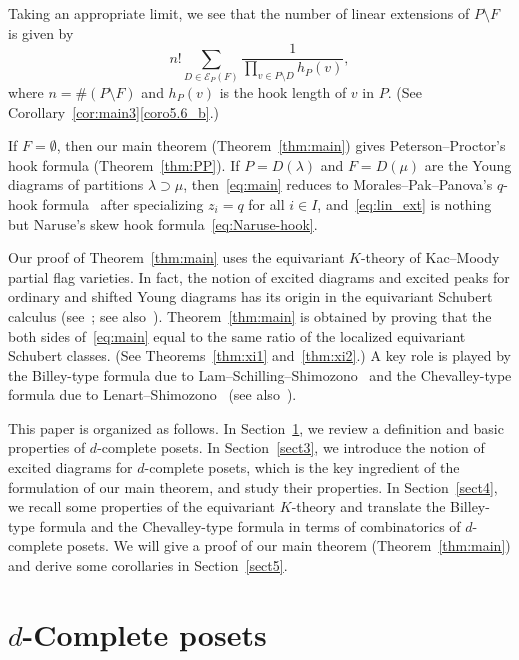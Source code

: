 \documentclass[10pt]{amsart}
\theoremstyle{definition}
\theoremstyle{remark}
\newcommand\EE{\mathcal{E}}
\begin{document}
Taking an appropriate limit, we see that 
the number of linear extensions of $P \setminus F$ is given by
\begin{equation}
\label{eq:lin_ext}
n! 
\sum_{D \in \EE_P(F)}
 \frac{ 1 }
 { \prod_{v \in P \setminus D} h_P(v) },
\end{equation}
where $n = \# (P \setminus F)$ and $h_P(v)$ is the hook length of $v$ in $P$.
(See Corollary~\ref{cor:main3}\ref{coro5.6_b}.)

If $F = \emptyset$, then our main theorem (Theorem~\ref{thm:main}) gives 
Peterson--Proctor's hook formula (Theorem~\ref{thm:PP}).
If $P = D(\lambda)$ and $F = D(\mu)$ are the Young diagrams of partitions $\lambda \supset \mu$, 
then~\eqref{eq:main} reduces to Morales--Pak--Panova's $q$-hook formula~\cite[Corollary~6.17]{MPP} 
after specializing $z_i = q$ for all $i \in I$, 
and~\eqref{eq:lin_ext} is nothing but Naruse's skew hook formula~\eqref{eq:Naruse-hook}.

Our proof of Theorem~\ref{thm:main} uses the equivariant $K$-theory of Kac--Moody partial flag varieties.
In fact, the notion of excited diagrams and excited peaks for ordinary and shifted Young diagrams 
has its origin in the equivariant Schubert calculus 
(see~\cite{IN1, IN2}; see also~\cite{GK, KN, Kr1, Kr2}).
Theorem~\ref{thm:main} is obtained by proving that 
the both sides of~\eqref{eq:main} equal to the same ratio of the localized equivariant Schubert classes. 
(See Theorems~\ref{thm:xi1} and~\ref{thm:xi2}.)
A key role is played by the Billey-type formula due to Lam--Schilling--Shimozono~\cite{LSS} 
and the Chevalley-type formula due to Lenart--Shimozono~\cite{LS} (see also~\cite{LP}).

This paper is organized as follows.
In Section~\ref{sect2}, we review a definition and basic properties of $d$-complete posets.
In Section~\ref{sect3}, we introduce the notion of excited diagrams for $d$-complete posets, 
which is the key ingredient of the formulation of our main theorem, and study their properties.
In Section~\ref{sect4}, we recall some properties of the equivariant $K$-theory 
and translate the Billey-type formula and the Chevalley-type formula in terms of combinatorics 
of $d$-complete posets.
We will give a proof of our main theorem (Theorem~\ref{thm:main}) and derive some corollaries 
in Section~\ref{sect5}.


\section{%
\texorpdfstring{$d$}{d}-Complete posets
}\label{sect2}
\end{document}
